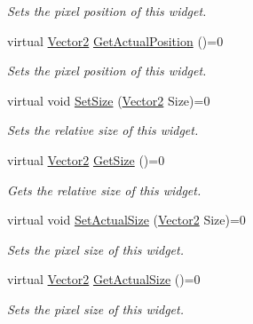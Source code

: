 \begin{DoxyCompactItemize}
\begin{DoxyCompactList}\small\item\em Sets the pixel position of this widget. \item\end{DoxyCompactList}\item 
virtual \hyperlink{classphys_1_1Vector2}{Vector2} \hyperlink{classphys_1_1UI_1_1Widget_a0a29fecff7f56d7909f65fd63b0990e7}{GetActualPosition} ()=0
\begin{DoxyCompactList}\small\item\em Sets the pixel position of this widget. \item\end{DoxyCompactList}\item 
virtual void \hyperlink{classphys_1_1UI_1_1Widget_ad5af5f04b60d43341037df6b0e329bbd}{SetSize} (\hyperlink{classphys_1_1Vector2}{Vector2} Size)=0
\begin{DoxyCompactList}\small\item\em Sets the relative size of this widget. \item\end{DoxyCompactList}\item 
virtual \hyperlink{classphys_1_1Vector2}{Vector2} \hyperlink{classphys_1_1UI_1_1Widget_a07039c19e57de314147ce066417da0a2}{GetSize} ()=0
\begin{DoxyCompactList}\small\item\em Gets the relative size of this widget. \item\end{DoxyCompactList}\item 
virtual void \hyperlink{classphys_1_1UI_1_1Widget_a8ceb54fd067847844b314dedd8e529f8}{SetActualSize} (\hyperlink{classphys_1_1Vector2}{Vector2} Size)=0
\begin{DoxyCompactList}\small\item\em Sets the pixel size of this widget. \item\end{DoxyCompactList}\item 
virtual \hyperlink{classphys_1_1Vector2}{Vector2} \hyperlink{classphys_1_1UI_1_1Widget_af3a685621ed220748c0940ea38c96ed2}{GetActualSize} ()=0
\begin{DoxyCompactList}\small\item\em Sets the pixel size of this widget. \item\end{DoxyCompactList}\end{DoxyCompactItemize}
